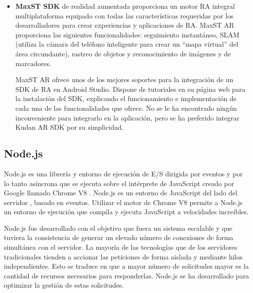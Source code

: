 \begin{itemize}
\item  \textbf{MaxST SDK} \cite{URL::maxst} de realidad aumentada proporciona un motor RA integral multiplataforma equipado con todas las características requeridas por los desarrolladores para crear experiencias y aplicaciones de RA. 
MaxST AR proporciona las siguientes funcionalidades: seguimiento instantáneo, SLAM \cite{URL::SLAM} (utiliza la cámara del teléfono inteligente para crear un ``mapa virtual'' del área circundante), rastreo de objetos y reconocimiento de imágenes y de marcadores.
    
MaxST AR ofrece unos de los mejores soportes para la integración de un SDK de RA en Android Studio. 
Dispone de  tutoriales en su página web para la instalación del SDK, explicando el funcionamiento e implementación de cada una de las funcionalidades que ofrece. 
No se le ha encontrado ningún inconveniente para integrarlo en la aplicación, pero se ha preferido integrar Kudan AR SDK por su simplicidad.
\end{itemize}



\subsection{Node.js}

Node.js \cite{URL::Nodejs} es una librería y entorno de ejecución de E/S dirigida por eventos y por lo tanto asíncrona que se ejecuta sobre el intérprete de JavaScript creado por Google llamado Chrome V8 \cite{URL::ChromeV8}. Node.js es un entorno de JavaScript del lado del servidor \cite{URL::serverside}, basado en eventos. Utilizar el motor de Chrome V8 permite a Node.js un entorno de ejecución que compila y ejecuta JavaScript a velocidades increíbles.

Node.js fue desarrollado con el objetivo que fuera un sistema escalable y que tuviera la consistencia de generar un elevado número de conexiones de forma simultánea con el servidor. La mayoría de las tecnologías que de los servidores tradicionales tienden a accionar las peticiones de forma aislada y mediante hilos independientes. Esto se traduce en que a mayor número de solicitudes mayor es la cantidad de recursos necesarios para responderlas. Node.js se ha desarrollado para optimizar la gestión de estas solicitudes.

